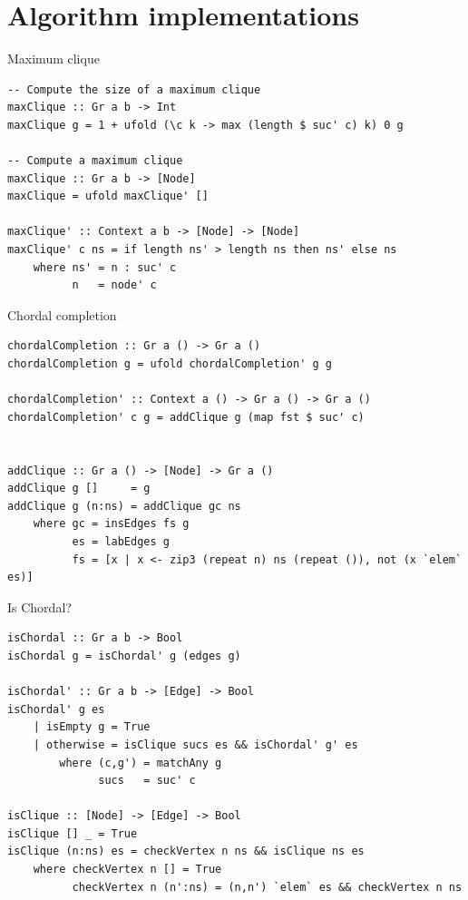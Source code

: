 \documentclass{beamer}
\begin{document}
\section{Algorithm implementations}

\begin{frame}[fragile]{Maximum clique}
\begin{verbatim}
-- Compute the size of a maximum clique
maxClique :: Gr a b -> Int                                                           
maxClique g = 1 + ufold (\c k -> max (length $ suc' c) k) 0 g

-- Compute a maximum clique
maxClique :: Gr a b -> [Node]
maxClique = ufold maxClique' []

maxClique' :: Context a b -> [Node] -> [Node]
maxClique' c ns = if length ns' > length ns then ns' else ns
    where ns' = n : suc' c
          n   = node' c

\end{verbatim}
\end{frame}

\begin{frame}[fragile]{Chordal completion}
\begin{verbatim}
chordalCompletion :: Gr a () -> Gr a ()                                                      
chordalCompletion g = ufold chordalCompletion' g g

chordalCompletion' :: Context a () -> Gr a () -> Gr a ()
chordalCompletion' c g = addClique g (map fst $ suc' c)


addClique :: Gr a () -> [Node] -> Gr a ()                                                    
addClique g []     = g
addClique g (n:ns) = addClique gc ns
    where gc = insEdges fs g
          es = labEdges g
          fs = [x | x <- zip3 (repeat n) ns (repeat ()), not (x `elem` es)]
\end{verbatim}
\end{frame}

\begin{frame}[fragile]{Is Chordal?}
\begin{verbatim}
isChordal :: Gr a b -> Bool
isChordal g = isChordal' g (edges g)

isChordal' :: Gr a b -> [Edge] -> Bool
isChordal' g es
    | isEmpty g = True
    | otherwise = isClique sucs es && isChordal' g' es
        where (c,g') = matchAny g                                                            
              sucs   = suc' c

isClique :: [Node] -> [Edge] -> Bool
isClique [] _ = True
isClique (n:ns) es = checkVertex n ns && isClique ns es
    where checkVertex n [] = True
          checkVertex n (n':ns) = (n,n') `elem` es && checkVertex n ns
\end{verbatim}
\end{frame}
\end{document}
